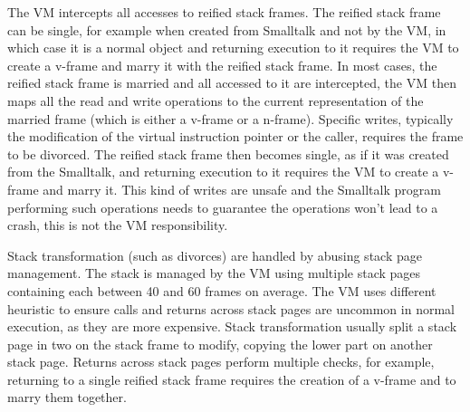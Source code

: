 \documentclass[a4paper,12pt,twoside]{../includes/ThesisStyle}
\begin{document}
The VM intercepts all accesses to reified stack frames. The reified stack frame can be single, for example when created from Smalltalk and not by the VM, in which case it is a normal object and returning execution to it requires the VM to create a v-frame and marry it with the reified stack frame. In most cases, the reified stack frame is married and all accessed to it are intercepted, the VM then maps all the read and write operations to the current representation of the married frame (which is either a v-frame or a n-frame). Specific writes, typically the modification of the virtual instruction pointer or the caller, requires the frame to be divorced. The reified stack frame then becomes single, as if it was created from the Smalltalk, and returning execution to it requires the VM to create a v-frame and marry it. This kind of writes are unsafe and the Smalltalk program performing such operations needs to guarantee the operations won't lead to a crash, this is not the VM responsibility. 

Stack transformation (such as divorces) are handled by abusing stack page management. The stack is managed by the VM using multiple stack pages containing each between 40 and 60 frames on average. The VM uses different heuristic to ensure calls and returns across stack pages are uncommon in normal execution, as they are more expensive. Stack transformation usually split a stack page in two on the stack frame to modify, copying the lower part on another stack page. Returns across stack pages perform multiple checks, for example, returning to a single reified stack frame requires the creation of a v-frame and to marry them together.


\ifx\wholebook\relax\else
    
\end{document}
